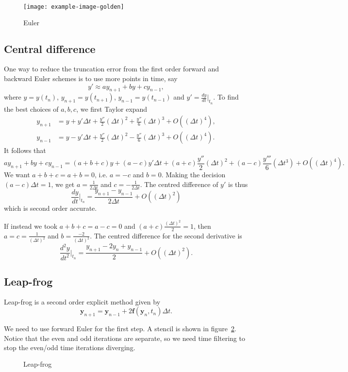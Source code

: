 \documentclass[11pt, a4paper]{article}
\theoremstyle{break}
\newcommand{\ve}{\mathbf} %
\newcommand{\dt}{\Delta t}
\newcommand{\dder}[2]{\frac{d #1}{d #2}}
\newcommand{\ddder}[3][2]{\frac{d^#1 #2}{d #3^#1}}
\newcommand{\eval}[1]{\big\rvert_{#1}}
\newcommand{\Eval}[1]{\bigg\rvert_{#1}}
\begin{document}
\begin{figure}\centering
	\texttt{[image: example-image-golden]}
	\caption{Euler}\label{fig:euler}
\end{figure}

\subsection{Central difference}
One way to reduce the truncation error from the first order forward and backward Euler schemes is to use more points in time, say \[y'\approx a	y_{n+1}+by+cy_{n-1},\] where $y=y(t_n)$, $y_{n+1}=y(t_{n+1})$, $y_{n-1}=y(t_{n-1})$ and $y' = \dder yt\eval{t_n}$. To find the best choices of $a,b,c$, we first Taylor expand \begin{align*}
y_{n+1}&=y+y'\dt+\frac{y''}{2}(\dt)^2+\frac{y''}{6}(\dt)^3+O((\dt)^4),\\
y_{n-1}&=y-y'\dt+\frac{y''}{2}(\dt)^2-\frac{y''}{6}(\dt)^3+O((\dt)^4).
\end{align*} It follows that \[ay_{n+1}+by+cy_{n-1}=(a+b+c)y+(a-c)y'\dt+(a+c)\frac{y''}{2}(\dt)^2 +(a-c)\frac{y'''}{6}(\dt^3)+O((\dt)^4).\]
We want $a+b+c=a+b=0$, i.e. $a=-c$ and $b=0$. Making the decision $(a-c)\dt=1$, we get $a=\frac1{2\dt}$ and $c=-\frac1{2\dt}$. The centred difference of $y'$ is thus \[\dder yt\Eval{t_n}=\frac{y_{n+1}-y_{n-1}}{2\dt}+O((\dt)^2)\] which is second order accurate.

If instead we took $a+b+c=a-c=0$ and $(a+c)\frac{(\dt)^2}{2}=1$, then $a=c=\frac1{(\dt)^2}$ and $b=\frac{-2}{(\dt)^2}$. The centred difference for the second derivative is \[\ddder yt\Eval{t_n}=\frac{y_{n+1}-2y_n+y_{n-1}}{2}+O((\dt)^2).\]

\subsection{Leap-frog}
Leap-frog is a second order explicit method given by
\[\ve y_{n+1}=\ve y_{n-1}+2\ve f(\ve y_n,t_n)\dt.\]

We need to use forward Euler for the first step. A stencil is shown in figure~\ref{fig:leapFrog}. Notice that the even and odd iterations are separate, so we need time filtering to stop the even/odd time iterations diverging.



\begin{figure}\centering
	
	\caption{Leap-frog}\label{fig:leapFrog}
\end{figure}
\end{document}
